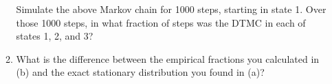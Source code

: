 \documentclass{article}
\begin{document}
\begin{enumerate}
\begin{enumerate}
            Simulate the above Markov chain for 1000 steps, starting in state 1. Over those 1000 steps, in what fraction of steps was the DTMC in each of states 1, 2, and 3?
            \item What is the difference between the empirical fractions you calculated in (b) and the exact stationary distribution you found in (a)?
        \end{enumerate}
\end{enumerate}
\end{document}
